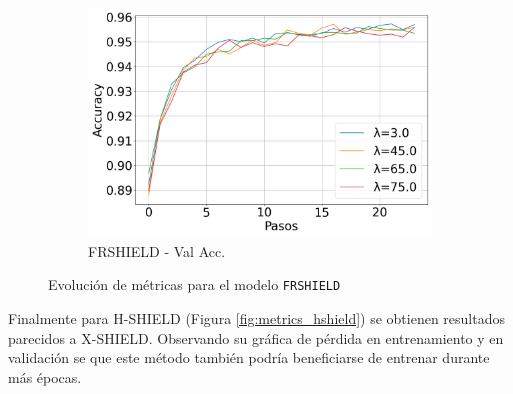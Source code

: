 \begin{figure}[H]
\begin{subfigure}[b]{0.3\textwidth}
        \includegraphics[width=\linewidth]{images/Val_Accuracy_evolucion_frshield.png}
        \caption{FRSHIELD - Val Acc.}
    \end{subfigure}

    \caption{Evolución de métricas para el modelo \texttt{FRSHIELD}}
    \label{fig:metrics_frshield}
\end{figure}

Finalmente para H-SHIELD (Figura \ref{fig:metrics_hshield}) se obtienen resultados parecidos a X-SHIELD. Observando su gráfica de pérdida en entrenamiento y en validación se que este método también podría beneficiarse de entrenar durante más épocas.

